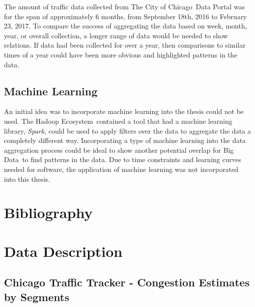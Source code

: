 \documentclass[titlepage,twocolumn]{article}
\newcommand{\HadoopEcosystem}{Hadoop Ecosystem}
\newcommand{\BigData}{Big Data}
\newcommand{\CityChicago}{City of Chicago}
\begin{document}
The amount of traffic data collected from The \CityChicago\ Data Portal was for the span of approximately 6 months, from September 18th, 2016 to February 23, 2017. To compare the success of aggregating the data based on week, month, year, or overall collection, a longer range of data would be needed to show relations. If data had been collected for over a year, then comparisons to similar times of a year could have been more obvious and highlighted patterns in the data. 

\subsection{Machine Learning}

An initial idea was to incorporate machine learning into the thesis  could not be used. The \HadoopEcosystem\ contained a tool that had a machine learning library, \textit{Spark}, could be used to apply filters over the data to aggregate the data a completely different way. Incorporating a type of machine learning into the data aggregation process could be ideal to show another potential overlap for \BigData\ to find patterns in the data. Due to time constraints and learning curves needed for software, the application of machine learning was not incorporated into this thesis. 



\cleardoublepage
\onecolumn
\section{Bibliography}




\cleardoublepage
\twocolumn
\appendix
\section{Data Description}

\subsection{Chicago Traffic Tracker - Congestion Estimates by Segments}
\label{app:segmentCTT}
\end{document}
